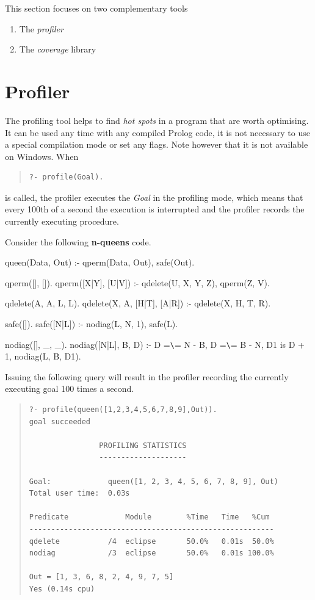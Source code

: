 This section focuses on two complementary tools
\begin{enumerate}
\item The \emph{profiler}
\item The \emph{coverage} library
\end{enumerate}

\section{Profiler}

 The profiling tool helps to find \emph{hot spots} in
a program that are worth optimising. It can be used any time with any
compiled Prolog code, it is not necessary to use a special compilation
mode or set any flags.  Note however that it is not available on
Windows.  When
\begin{quote}\begin{verbatim}
?- profile(Goal).
\end{verbatim}\end{quote}
 is called, the profiler executes the \emph{Goal} in
the profiling mode, which means that every 100th of a second the
execution is interrupted and the profiler records the currently
executing procedure.

Consider the following \textbf{n-queens} code.
\begin{code}
queen(Data, Out) :-
        qperm(Data, Out),
        safe(Out).

qperm([], []).
qperm([X|Y], [U|V]) :-
        qdelete(U, X, Y, Z),
        qperm(Z, V).

qdelete(A, A, L, L).
qdelete(X, A, [H|T], [A|R]) :-
        qdelete(X, H, T, R).

safe([]).
safe([N|L]) :-
        nodiag(L, N, 1),
        safe(L).

nodiag([], _, _).
nodiag([N|L], B, D) :-
        D =\verb+\+= N - B,
        D =\verb+\+= B - N,
        D1 is D + 1,
        nodiag(L, B, D1).
\end{code}

Issuing the following query will result in the profiler recording the
currently executing goal 100 times a second.

\begin{quote}\begin{verbatim}
?- profile(queen([1,2,3,4,5,6,7,8,9],Out)).
goal succeeded

                PROFILING STATISTICS
                --------------------

Goal:             queen([1, 2, 3, 4, 5, 6, 7, 8, 9], Out)
Total user time:  0.03s

Predicate             Module        %Time   Time   %Cum
--------------------------------------------------------
qdelete           /4  eclipse       50.0%   0.01s  50.0%
nodiag            /3  eclipse       50.0%   0.01s 100.0%

Out = [1, 3, 6, 8, 2, 4, 9, 7, 5]
Yes (0.14s cpu)
\end{verbatim}\end{quote}

